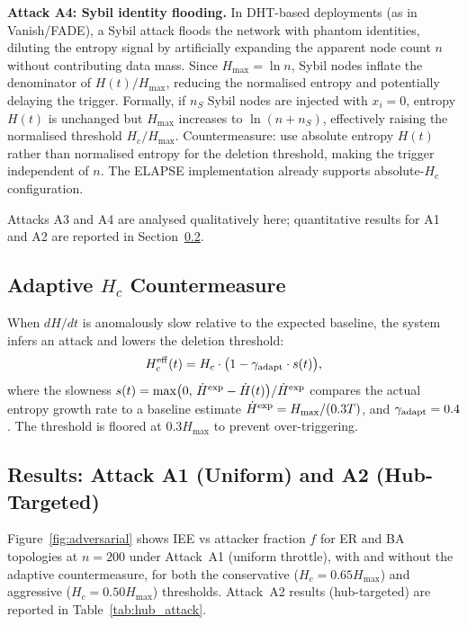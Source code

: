 \documentclass[review,12pt]{elsarticle}
\newcommand{\Hc}{H_c}
\newcommand{\Hmax}{H_{\max}}
\begin{document}
\textbf{Attack A4: Sybil identity flooding.}
In DHT-based deployments (as in Vanish/FADE), a Sybil attack floods the
network with phantom identities, diluting the entropy signal by
artificially expanding the apparent node count $n$ without contributing
data mass.  Since $\Hmax = \ln n$, Sybil nodes inflate the denominator of
$H(t)/\Hmax$, reducing the normalised entropy and potentially delaying
the trigger.  Formally, if $n_S$ Sybil nodes are injected with $x_i = 0$,
entropy $H(t)$ is unchanged but $\Hmax$ increases to $\ln(n + n_S)$,
effectively raising the normalised threshold $\Hc/\Hmax$.
Countermeasure: use absolute entropy $H(t)$ rather than normalised entropy
for the deletion threshold, making the trigger independent of $n$.
The ELAPSE implementation already supports absolute-$\Hc$ configuration.

\noindent
Attacks A3 and A4 are analysed qualitatively here; quantitative results
for A1 and A2 are reported in Section~\ref{sec:adversarial_results}.

\subsection{Adaptive \texorpdfstring{$H_c$}{Hc} Countermeasure}

When $dH/dt$ is anomalously slow relative to the expected baseline, the
system infers an attack and lowers the deletion threshold:
\begin{equation}
  \Hc^{\rm eff}(t) = \Hc \cdot \bigl(1 - \gamma_{\rm adapt} \cdot s(t)\bigr),
  \label{eq:adaptive_hc}
\end{equation}
where the slowness $s(t) = \max\bigl(0,\, \dot{H}^{\rm exp} - \dot{H}(t)\bigr) / \dot{H}^{\rm exp}$
compares the actual entropy growth rate to a baseline estimate
$\dot{H}^{\rm exp} = \Hmax / (0.3T)$, and $\gamma_{\rm adapt} = 0.4$.
The threshold is floored at $0.3\Hmax$ to prevent over-triggering.

\subsection{Results: Attack A1 (Uniform) and A2 (Hub-Targeted)}
\label{sec:adversarial_results}

Figure~\ref{fig:adversarial} shows IEE vs attacker fraction $f$ for ER
and BA topologies at $n=200$ under Attack~A1 (uniform throttle), with and
without the adaptive countermeasure, for both the conservative
($\Hc = 0.65\Hmax$) and aggressive ($\Hc = 0.50\Hmax$) thresholds.
Attack~A2 results (hub-targeted) are reported in Table~\ref{tab:hub_attack}.
\end{document}
